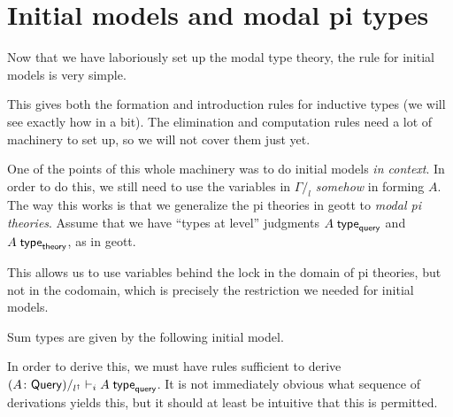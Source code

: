 \documentclass[fleqn,leqno]{article}
\begin{document}
\section{Initial models and modal pi types} \label{sec:initial}

Now that we have laboriously set up the modal type theory, the rule for initial models is very simple.
%
\begin{mathpar}
\end{mathpar}
%
This gives both the formation and introduction rules for inductive types (we will see exactly how in a bit). The elimination and computation rules need a lot of machinery to set up, so we will not cover them just yet.

One of the points of this whole machinery was to do initial models \emph{in context}. In order to do this, we still need to use the variables in $\Gamma/_l$ \emph{somehow} in forming $A$. The way this works is that we generalize the pi theories in geott to \emph{modal pi theories}. Assume that we have ``types at level'' judgments $A \;\mathsf{type}_{\mathsf{query}}$ and $A \;\mathsf{type}_{\mathsf{theory}}$, as in geott.
%

This allows us to use variables behind the lock in the domain of pi theories, but not in the codomain, which is precisely the restriction we needed for initial models.

\begin{example}
  Sum types are given by the following initial model.
  \begin{mathpar}
  \end{mathpar}
  In order to derive this, we must have rules sufficient to derive $(A \colon \mathsf{Query})/_{l^\dagger} \vdash_i A \;\mathsf{type}_{\mathsf{query}}$. It is not immediately obvious what sequence of derivations yields this, but it should at least be intuitive that this is permitted.
\end{example}
\end{document}
